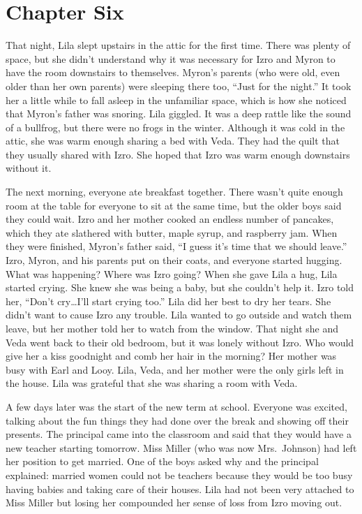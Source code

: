 \documentclass[
  letterpaper,
]{book}
\begin{document}

\chapter{Chapter Six}\label{chapter-six}

That night, Lila slept upstairs in the attic for the first time. There
was plenty of space, but she didn't understand why it was necessary for
Izro and Myron to have the room downstairs to themselves. Myron's
parents (who were old, even older than her own parents) were sleeping
there too, ``Just for the night.'' It took her a little while to fall
asleep in the unfamiliar space, which is how she noticed that Myron's
father was snoring. Lila giggled. It was a deep rattle like the sound of
a bullfrog, but there were no frogs in the winter. Although it was cold
in the attic, she was warm enough sharing a bed with Veda. They had the
quilt that they usually shared with Izro. She hoped that Izro was warm
enough downstairs without it.

The next morning, everyone ate breakfast together. There wasn't quite
enough room at the table for everyone to sit at the same time, but the
older boys said they could wait. Izro and her mother cooked an endless
number of pancakes, which they ate slathered with butter, maple syrup,
and raspberry jam. When they were finished, Myron's father said, ``I
guess it's time that we should leave.'' Izro, Myron, and his parents put
on their coats, and everyone started hugging. What was happening? Where
was Izro going? When she gave Lila a hug, Lila started crying. She knew
she was being a baby, but she couldn't help it. Izro told her, ``Don't
cry\ldots I'll start crying too.'' Lila did her best to dry her tears.
She didn't want to cause Izro any trouble. Lila wanted to go outside and
watch them leave, but her mother told her to watch from the window. That
night she and Veda went back to their old bedroom, but it was lonely
without Izro. Who would give her a kiss goodnight and comb her hair in
the morning? Her mother was busy with Earl and Looy. Lila, Veda, and her
mother were the only girls left in the house. Lila was grateful that she
was sharing a room with Veda.

A few days later was the start of the new term at school. Everyone was
excited, talking about the fun things they had done over the break and
showing off their presents. The principal came into the classroom and
said that they would have a new teacher starting tomorrow. Miss Miller
(who was now Mrs.~Johnson) had left her position to get married. One of
the boys asked why and the principal explained: married women could not
be teachers because they would be too busy having babies and taking care
of their houses. Lila had not been very attached to Miss Miller but
losing her compounded her sense of loss from Izro moving out.
\end{document}
